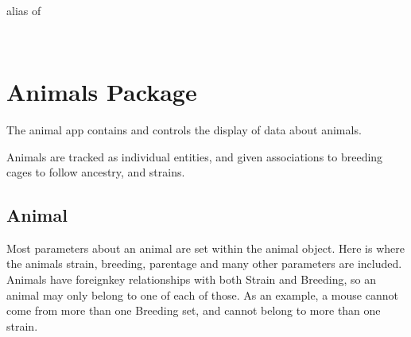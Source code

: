 \documentclass[letterpaper,10pt,english]{sphinxmanual}
\begin{document}

\begin{fulllineitems}
\label{api:data.admin.TreatmentInline}~

\begin{fulllineitems}
\label{api:data.admin.TreatmentInline.media}
\end{fulllineitems}


\begin{fulllineitems}
\label{api:data.admin.TreatmentInline.model}
alias of 

\end{fulllineitems}


\end{fulllineitems}


\begin{fulllineitems}
\label{api:data.admin.VendorAdmin}~

\begin{fulllineitems}
\label{api:data.admin.VendorAdmin.media}
\end{fulllineitems}


\end{fulllineitems}



\section{Animals Package}
\label{api:animals-package}\label{api:module-animal}
The animal app contains and controls the display of data about animals.

Animals are tracked as individual entities, and given associations to breeding cages to follow ancestry, and strains.


\subsection{Animal}
\label{api:animal}
Most parameters about an animal are set within the animal object.  Here is where the animals strain, breeding, parentage and many other parameters are included.  Animals have foreignkey relationships with both Strain and Breeding, so an animal may only belong to one of each of those.  As an example, a mouse cannot come from more than one Breeding set, and cannot belong to more than one strain.
\end{document}
